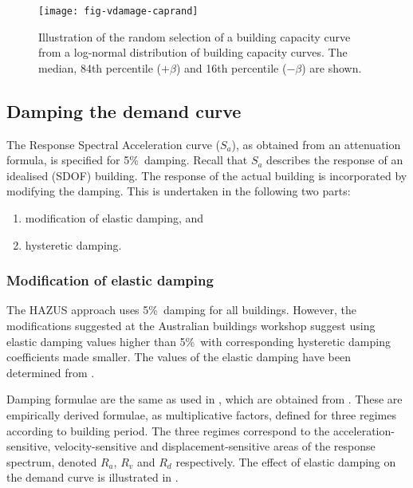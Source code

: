 \begin{figure}[htp]
\centering
{}
\texttt{[image: fig-vdamage-caprand]}
\caption{Illustration of the random selection of a building
capacity curve from a log-normal
distribution of building capacity curves.
The median, 84th percentile ($+\beta$) and 16th percentile
($-\beta$) are shown.} \label{fig:vdamage-capcurve-random}
\end{figure}




\subsection{Damping the demand curve}
\label{subsec:v-dam-damping}

The Response Spectral Acceleration curve ($S_a$), as obtained from
an attenuation formula, is specified for 5\%\ damping. Recall that
$S_a$ describes the response of an idealised (SDOF) building. The
response of the actual building is incorporated by modifying the
damping. This is undertaken in the following two parts:
\begin{enumerate}
\item modification of elastic damping, and \item hysteretic
damping.
\end{enumerate}


\subsubsection{Modification of elastic damping}
\label{sec:damage-elasticdamping}

The HAZUS approach uses 5\%\ damping for all buildings. However,
the modifications suggested at the Australian buildings workshop
\citep{dr_Stehle01a} suggest using elastic damping values higher
than 5\%\ with corresponding hysteretic damping coefficients made
smaller. The values of the elastic damping have been determined
from \cite{Newmark82}.

Damping formulae are the same as used in \cite{dr_FEMA99b}, which
are obtained from \cite{Newmark82}. These are empirically derived
formulae, as multiplicative factors, defined for three regimes
according to building period. The three regimes correspond to the
acceleration-sensitive, velocity-sensitive and
displacement-sensitive areas of the response spectrum, denoted
$R_a$, $R_v$ and $R_d$ respectively. The effect of elastic damping
on the demand curve is illustrated in
.

